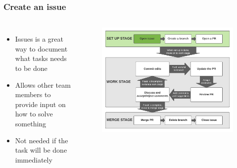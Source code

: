 \documentclass[aspectratio=169]{beamer} %
\begin{document}
\begin{frame}
	\frametitle{Create an issue}
	
	\begin{columns}[c]
		
		
		\begin{itemize}
			\setlength\itemsep{1em}
			\item Issues is a great way to document what tasks needs to be done
			\item Allows other team members to provide input on how to solve something
			\item Not needed if the task will be done immediately
		\end{itemize}
		
		\vspace{-.75cm}
		\begin{figure}
			\centering
			\includegraphics[width=\textwidth]{./img/branch-pr-merge-cycle-S1-1.png}
		\end{figure}
		
	\end{columns}
\end{frame}
\end{document}
